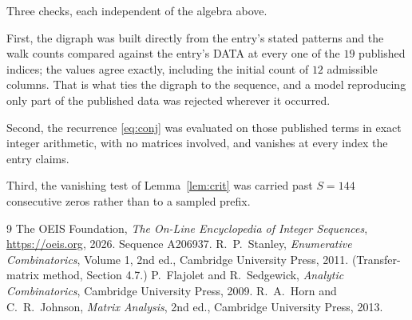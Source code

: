 \documentclass[11pt,a4paper]{article}
\theoremstyle{plain}
\theoremstyle{definition}
\begin{document}
Three checks, each independent of the algebra above.

First, the digraph was built directly from the entry's stated patterns and the walk counts
compared against the entry's DATA at every one of the $19$ published indices; the
values agree exactly, including the initial count of $12$ admissible columns. That is
what ties the digraph to the sequence, and a model reproducing only part of the published
data was rejected wherever it occurred.

Second, the recurrence \eqref{eq:conj} was evaluated on those published terms in exact
integer arithmetic, with no matrices involved, and vanishes at every index the entry claims.

Third, the vanishing test of Lemma~\ref{lem:crit} was carried past $S=144$ consecutive
zeros rather than to a sampled prefix.

\begin{thebibliography}{9}
 The OEIS Foundation, \emph{The On-Line Encyclopedia of Integer
Sequences}, \url{https://oeis.org}, 2026. Sequence A206937.
 R.~P.~Stanley, \emph{Enumerative Combinatorics}, Volume 1, 2nd ed.,
Cambridge University Press, 2011. (Transfer-matrix method, Section 4.7.)
 P.~Flajolet and R.~Sedgewick, \emph{Analytic Combinatorics}, Cambridge
University Press, 2009.
 R.~A.~Horn and C.~R.~Johnson, \emph{Matrix Analysis}, 2nd ed., Cambridge
University Press, 2013.
\end{thebibliography}
\end{document}
